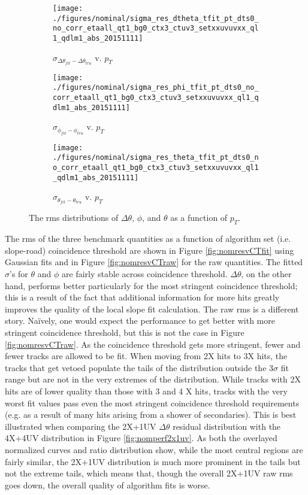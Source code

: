 \begin{figure}[!htbp]\captionsetup{justification=centering}
  \begin{center}
  \begin{subfigure}{0.3\textwidth}\caption{$\sigma_{\Delta\theta_{fit}-\Delta\theta_{tru}}$ v. $p_T$}\texttt{[image: ./figures/nominal/sigma\_res\_dtheta\_tfit\_pt\_dts0\_no\_corr\_etaall\_qt1\_bg0\_ctx3\_ctuv3\_setxxuvuvxx\_ql1\_qdlm1\_abs\_20151111]}\end{subfigure}
  \begin{subfigure}{0.3\textwidth}\caption{$\sigma_{\phi_{fit}-\phi_{tru}}$ v. $p_T$}\texttt{[image: ./figures/nominal/sigma\_res\_phi\_tfit\_pt\_dts0\_no\_corr\_etaall\_qt1\_bg0\_ctx3\_ctuv3\_setxxuvuvxx\_ql1\_qdlm1\_abs\_20151111]}\end{subfigure}
  \begin{subfigure}{0.3\textwidth}\caption{$\sigma_{\theta_{fit}-\theta_{tru}}$ v. $p_T$}\texttt{[image: ./figures/nominal/sigma\_res\_theta\_tfit\_pt\_dts0\_no\_corr\_etaall\_qt1\_bg0\_ctx3\_ctuv3\_setxxuvuvxx\_ql1\_qdlm1\_abs\_20151111]}\end{subfigure}
  \caption{\label{fig:nomresvpt} The rms distributions of $\Delta\theta$, $\phi$, and $\theta$ as a function of $p_T$.}
  \end{center}
\end{figure}

The rms of the three benchmark quantities as a function of algorithm set (i.e. slope-road) coincidence threshold are shown in Figure \ref{fig:nomresvCTfit} using Gaussian fits and in Figure \ref{fig:nomresvCTraw} for the raw quantities.  The fitted $\sigma$'s for $\theta$ and $\phi$ are fairly stable across coincidence threshold.  $\Delta\theta$, on the other hand, performs better particularly for the most stringent coincidence threshold; this is a result of the fact that additional information for more hits greatly improves the quality of the local slope fit calculation.  The raw rms is a different story.  Na\"ively, one would expect the performance to get better with more stringent coincidence threshold, but this is not the case in Figure \ref{fig:nomresvCTraw}.  As the coincidence threshold gets more stringent, fewer and fewer tracks are allowed to be fit.  When moving from 2X hits to 3X hits, the tracks that get vetoed populate the tails of the distribution outside the 3$\sigma$ fit range but are not in the very extremes of the distribution.  While tracks with 2X hits are of lower quality than those with 3 and 4 X hits, tracks with the very worst fit values pass even the most stringent coincidence threshold requirements (e.g. as a result of many hits arising from a shower of secondaries).  This is best illustrated when comparing the 2X+1UV $\Delta\theta$ residual distribution with the 4X+4UV distribution in Figure \ref{fig:nomperf2x1uv}.  As both the overlayed normalized curves and ratio distribution show, while the most central regions are fairly similar, the 2X+1UV distribution is much more prominent in the tails but not the extreme tails, which means that, though the overall 2X+1UV raw rms goes down, the overall quality of algorithm fits is worse.

